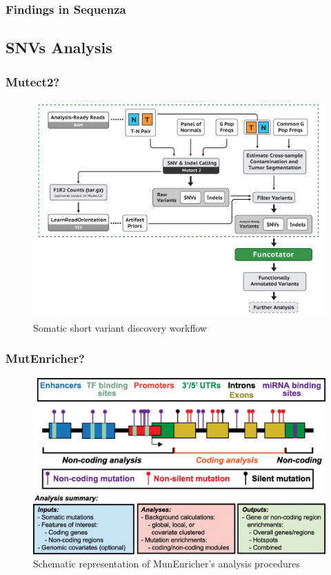 \documentclass{beamer}
\begin{document}
    \begin{frame}
        \frametitle{Findings in Sequenza}
    \end{frame}

    \subsection{SNVs Analysis}
    \begin{frame}
        \frametitle{Mutect2?}

        \begin{figure}
            \includegraphics[width=0.6 \linewidth]{figures/Workflow/somatic_short_variants.png}
            \caption{Somatic short variant discovery workflow \protect\cite{gatk1, gatk2}}
        \end{figure}
    \end{frame}

    \begin{frame}
        \frametitle{MutEnricher?}

        \begin{figure}
            \includegraphics[width=0.8 \linewidth]{figures/Workflow/MutEnricher.jpg}
            \caption{Schematic representation of MunEnricher's analysis procedures \protect\cite{MutEnricher1}}
        \end{figure}
    \end{frame}
\end{document}
